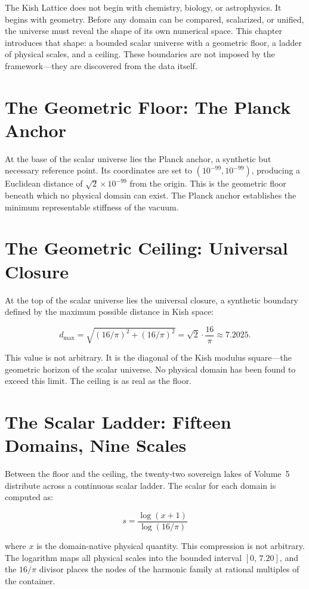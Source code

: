 \documentclass[11pt, letterpaper, openany]{book}
\begin{document}
The Kish Lattice does not begin with chemistry, biology, or astrophysics. It begins with geometry.
Before any domain can be compared, scalarized, or unified, the universe must reveal the shape of
its own numerical space. This chapter introduces that shape: a bounded scalar universe with a
geometric floor, a ladder of physical scales, and a ceiling. These boundaries are not imposed by
the framework---they are discovered from the data itself.

\section*{The Geometric Floor: The Planck Anchor}
At the base of the scalar universe lies the Planck anchor, a synthetic but necessary reference
point. Its coordinates are set to $(10^{-99}, 10^{-99})$, producing a Euclidean distance of
$\sqrt{2}\times 10^{-99}$ from the origin. This is the geometric floor beneath which no physical
domain can exist. The Planck anchor establishes the minimum representable stiffness of the
vacuum.

\section*{The Geometric Ceiling: Universal Closure}
At the top of the scalar universe lies the universal closure, a synthetic boundary defined by the
maximum possible distance in Kish space:

\[
d_{\max} = \sqrt{(16/\pi)^2 + (16/\pi)^2} = \sqrt{2}\cdot\frac{16}{\pi} \approx 7.2025.
\]

This value is not arbitrary. It is the diagonal of the Kish modulus square---the geometric
horizon of the scalar universe. No physical domain has been found to exceed this limit.
The ceiling is as real as the floor.

\section*{The Scalar Ladder: Fifteen Domains, Nine Scales}
Between the floor and the ceiling, the twenty-two sovereign lakes of Volume~5 distribute across
a continuous scalar ladder. The scalar for each domain is computed as:

\[
s = \frac{\log(x + 1)}{\log(16/\pi)}
\]

where $x$ is the domain-native physical quantity. This compression is not arbitrary. The
logarithm maps all physical scales into the bounded interval $[0,\, 7.20]$, and the $16/\pi$
divisor places the nodes of the harmonic family at rational multiples of the container.
\end{document}
